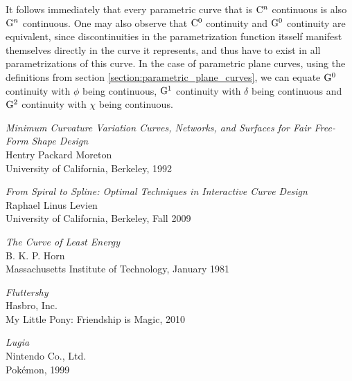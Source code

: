 \documentclass[a4paper]{article}
\begin{document}
			It follows immediately that every parametric curve that is \(\mathrm{C}^{n}\) continuous is also \(\mathrm{G}^{n}\) continuous. One may also observe that \(\mathrm{C}^{0}\) continuity and \(\mathrm{G}^{0}\) continuity are equivalent, since discontinuities in the parametrization function itsself manifest themselves directly in the curve it represents, and thus have to exist in all parametrizations of this curve. In the case of parametric plane curves, using the definitions from section \ref{section:parametric_plane_curves}, we can equate \(\mathrm{G}^{0}\) continuity with \(\phi\) being continuous, \(\mathrm{G}^{1}\) continuity with \(\delta\) being continuous and \(\mathrm{G}^{2}\) continuity with \(\chi\) being continuous.

	\clearpage

	\begin{thebibliography}{}

			\emph{Minimum Curvature Variation Curves, Networks, and Surfaces for Fair Free-Form Shape Design}\\
			Hentry Packard Moreton\\
			University of California, Berkeley, 1992

			\emph{From Spiral to Spline: Optimal Techniques in Interactive Curve Design}\\
			Raphael Linus Levien\\
			University of California, Berkeley, Fall 2009

			\emph{The Curve of Least Energy}\\
			B. K. P. Horn\\
			Massachusetts Institute of Technology, January 1981

			\emph{Fluttershy}\\
			Hasbro, Inc.\\
			My Little Pony: Friendship is Magic, 2010

			\emph{Lugia}\\
			Nintendo Co., Ltd.\\
			Pokémon, 1999

	\end{thebibliography}
\end{document}
